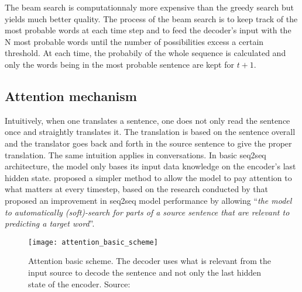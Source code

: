 The beam search is computationnaly more expensive than the greedy search but yields much better quality. The process of the beam search is to keep track of the most probable words at each time step and to feed the decoder's input with the N most probable words until the number of possibilities excess a certain threshold. At each time, the probabily of the whole sequence is calculated and only the words being in the most probable sentence are kept for $t+1$.


\subsection{Attention mechanism}
Intuitively, when one translates a sentence, one does not only read the sentence once and straightly translates it. The translation is based on the sentence overall and the translator goes back and forth in the source sentence to give the proper translation. The same intuition applies in conversations.
In basic seq2seq architecture, the model only bases its input data knowledge on the encoder's last hidden state. \citet{1508.04025} proposed a simpler method to allow the model to pay attention to what matters at every timestep, based on the research conducted by \citet{1409.0473} that proposed an improvement in seq2seq model performance by allowing ``\textit{the model to automatically (soft)-search for parts of a source sentence that are relevant to predicting a target word}''.

\begin{figure}
    \centering
    \texttt{[image: attention\_basic\_scheme]}
    \caption[Attention basic scheme]{Attention basic scheme. The decoder uses what is relevant from the input source to decode the sentence and not only the last hidden state of the encoder. Source:~\citet{youtube-nmt-attention}}
    \label{fig:attention_basic_scheme}
\end{figure}

